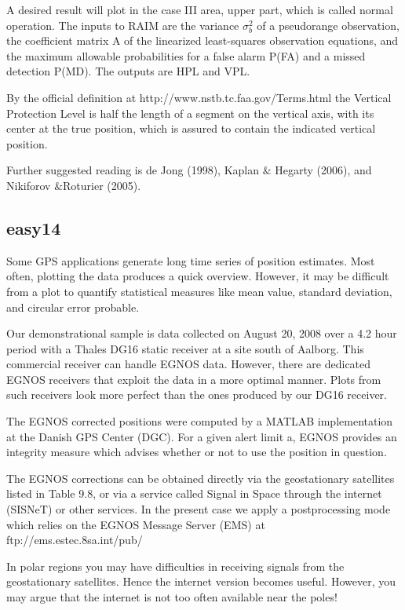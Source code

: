 		A desired result will plot in the case III area, upper part, which is called normal operation. The inputs to RAIM are the variance $\sigma^2_b$ of a pseudorange observation, the coefficient matrix A of the linearized least-squares observation equations, and the maximum allowable probabilities for a false alarm P(FA) and a missed detection P(MD). The outputs are HPL and VPL.
		
		By the official definition at http://www.nstb.tc.faa.gov/Terms.html the Vertical Protection Level is half the length of a segment on the vertical axis, with its center at the true position, which is assured to contain the indicated vertical position.
		
		Further suggested reading is de Jong (1998), Kaplan $\&$ Hegarty (2006), and Nikiforov $\&$Roturier (2005).
	\subsection{easy14}\label{subsec:easy14}
		Some GPS applications generate long time series of position estimates. Most often, plotting the data produces a quick overview. However, it may be difficult from a plot to quantify statistical measures like mean value, standard deviation, and circular error probable.
		
		Our demonstrational sample is data collected on August 20, 2008 over a 4.2 hour period with a Thales DG16 static receiver at a site south of Aalborg. This commercial receiver can handle EGNOS data. However, there are dedicated EGNOS receivers that exploit the data in a more optimal manner. Plots from such receivers look more perfect than the ones produced by our DG16 receiver.
		
		The EGNOS corrected positions were computed by a MATLAB implementation at the Danish GPS Center (DGC). For a given alert limit a, EGNOS provides an integrity measure which advises whether or not to use the position in question.
		
		The EGNOS corrections can be obtained directly via the geostationary satellites listed in Table 9.8, or via a service called Signal in Space through the internet (SISNeT) or other services. In the present case we apply a postprocessing mode which relies on the EGNOS Message Server (EMS) at ftp://ems.estec.8sa.int/pub/
		
		In polar regions you may have difficulties in receiving signals from the geostationary satellites. Hence the internet version becomes useful. However, you may argue that the internet is not too often available near the poles!
		
